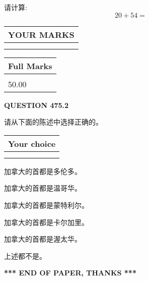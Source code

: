 \documentclass{ctexart}
\begin{document}
  
 
请计算:
\begin{equation}
20 +  %
54 = \nonumber
\end{equation}
 

 

 
  
\vspace{0.2in}
  
\noindent\begin{tabular}{|l|}
\hline
 YOUR MARKS  \\
\hline
 \\ 
 \\ 
\hline
\end{tabular}
\hspace{0.05in} \begin{tabular}{|l|}
\hline
 Full Marks  \\
\hline
 \\ 
50.00 \\
\hline
\end{tabular}
{\textbf{\Large{QUESTION
475.2 
}}}
  
  
请从下面的陈述中选择正确的。
  
  
\noindent\hspace{3.0in} \begin{tabular}{|l|}
\hline
Your choice \\
\hline
 \\ 
 \\ 
\hline
\end{tabular}
  
  
 
 
加拿大的首都是多伦多。
 
 
加拿大的首都是温哥华。
 
 
加拿大的首都是蒙特利尔。
 
 
加拿大的首都是卡尔加里。
 
 
加拿大的首都是渥太华。
 
 
 上述都不是。
 
 
   
   
 \vspace{0.2in}
 
   
   
   
   
\vspace{1.0in} 
{\textbf{\large{ *** END OF PAPER, THANKS *** }}} 
   
\end{document}
